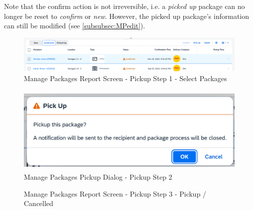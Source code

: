 \bigskip
Note that the confirm action is not irreversible, i.e. a \textit{picked up} package can no longer be reset to \textit{confirm} or \textit{new}. However, the picked up package's information can still be modified (see \autoref{subsubsec:MPedit}).

\begin{figure}[H]
	\centering
	\includegraphics[width=1\linewidth]{images/user_doc/managePack/ReportScreen/pickup/pickupEnabled.png}
	\caption{Manage Packages Report Screen - Pickup Step 1 - Select Packages}
	\label{fig:MPReportPickupBtn}
\end{figure}

\begin{figure}[H]
	\centering
	\includegraphics[height=120pt]{images/user_doc/managePack/ReportScreen/pickup/pickupDialogOk.png}
	\caption{Manage Packages Pickup Dialog - Pickup Step 2}
	\label{fig:MPReportPickupDlg}
\end{figure}

\begin{figure}[H]
	\centering
  
	\vspace{10pt}
    \caption{Manage Packages Report Screen - Pickup Step 3 - Pickup / Cancelled}
	\label{fig:MPReportPickupDlgButton}
\end{figure}

